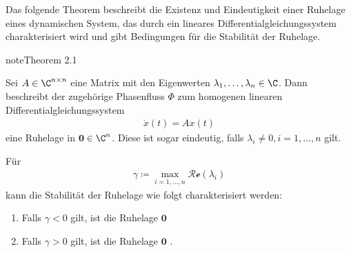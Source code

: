 \documentclass[letterpaper,10pt,german]{jupyterBook}
\begin{document}
\sphinxAtStartPar
Das folgende Theorem beschreibt die Existenz und Eindeutigkeit einer Ruhelage eines dynamischen System, das durch ein lineares Differentialgleichungssystem charakterisiert wird und gibt Bedingungen für die Stabilität der Ruhelage.
\label{odestability/ruhelagen:thm:stablin}
\begin{sphinxadmonition}{note}{Theorem 2.1}



\sphinxAtStartPar
Sei \(A\in \C^{n\times n}\) eine Matrix mit den Eigenwerten \(\lambda_1,\dots, \lambda_n\in \C\).
Dann beschreibt der zugehörige Phasenfluss \(\Phi\) zum homogenen linearen Differentialgleichungssystem
\begin{equation*}
\begin{split}\dot{x}(t) = Ax(t)\end{split}
\end{equation*}
\sphinxAtStartPar
eine Ruhelage in \(\mathbf{0} \in \C^n\).
Diese ist sogar eindeutig, falls \(\lambda_i\neq 0, i=1,\ldots,n\) gilt.

\sphinxAtStartPar
Für
\begin{equation*}
\begin{split}\gamma \coloneqq \max_{i=1,\dots,n} \mathcal{Re}(\lambda_i)\end{split}
\end{equation*}
\sphinxAtStartPar
kann die Stabilität der Ruhelage wie folgt charakterisiert werden:
\begin{enumerate}
%
\item {} 
\sphinxAtStartPar
Falls \(\gamma <0\) gilt, ist die Ruhelage \(\mathbf{0}\) 

\item {} 
\sphinxAtStartPar
Falls \(\gamma >0\) gilt, ist die Ruhelage \(\mathbf{0}\) .

\end{enumerate}
\end{sphinxadmonition}
\end{document}
